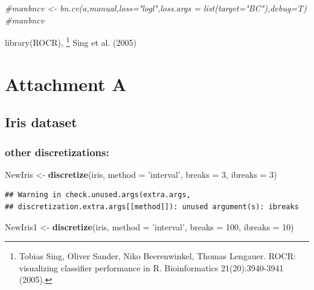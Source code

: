 \documentclass[]{article}
\newenvironment{Shaded}{\begin{snugshade}}{\end{snugshade}}
\newcommand{\KeywordTok}[1]{\textcolor[rgb]{0.13,0.29,0.53}{\textbf{{#1}}}}
\newcommand{\DataTypeTok}[1]{\textcolor[rgb]{0.13,0.29,0.53}{{#1}}}
\newcommand{\DecValTok}[1]{\textcolor[rgb]{0.00,0.00,0.81}{{#1}}}
\newcommand{\StringTok}[1]{\textcolor[rgb]{0.31,0.60,0.02}{{#1}}}
\newcommand{\CommentTok}[1]{\textcolor[rgb]{0.56,0.35,0.01}{\textit{{#1}}}}
\newcommand{\NormalTok}[1]{{#1}}
\begin{document}
\begin{Shaded}
\begin{Highlighting}[]
\CommentTok{#manbncv <- bn.cv(a,manual,loss="logl",loss.args = list(target="BC"),debug=T)}
\CommentTok{#manbncv}
\end{Highlighting}
\end{Shaded}

library(ROCR),
\footnote{Tobias Sing, Oliver Sander, Niko Beerenwinkel, Thomas Lengauer.
ROCR: visualizing classifier performance in R.
Bioinformatics 21(20):3940-3941 (2005).} \cite{Sing2005} Sing et al.
(2005)

\section{Attachment A}\label{attachment-a}

\subsection{Iris dataset}\label{iris-dataset}

\subsubsection{other discretizations:}\label{other-discretizations}

\begin{Shaded}
\begin{Highlighting}[]
\NormalTok{NewIris <-}\StringTok{  }\KeywordTok{discretize}\NormalTok{(iris, }\DataTypeTok{method =} \StringTok{'interval'}\NormalTok{, }\DataTypeTok{breaks =} \DecValTok{3}\NormalTok{, }\DataTypeTok{ibreaks =} \DecValTok{3}\NormalTok{)}
\end{Highlighting}
\end{Shaded}

\begin{verbatim}
## Warning in check.unused.args(extra.args,
## discretization.extra.args[[method]]): unused argument(s): ibreaks
\end{verbatim}

\begin{Shaded}
\begin{Highlighting}[]
\NormalTok{NewIris1 <-}\StringTok{  }\KeywordTok{discretize}\NormalTok{(iris, }\DataTypeTok{method =} \StringTok{'interval'}\NormalTok{, }\DataTypeTok{breaks =} \DecValTok{100}\NormalTok{, }\DataTypeTok{ibreaks =} \DecValTok{10}\NormalTok{)}
\end{Highlighting}
\end{Shaded}
\end{document}
